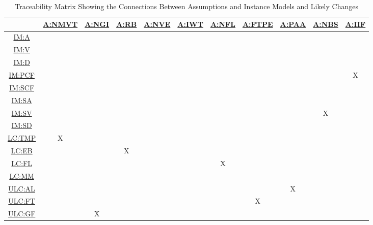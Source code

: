 \documentclass[12pt]{article}
\newcommand{\hpref}[1]{\hyperref[#1]{#1}}
\begin{document}
\begin{table}[H]
\centering
\begin{tabular}{|c|c|c|c|c|c|c|c|c|c|c|}
\hline
	& \hpref{A:NMVT}& \hpref{A:NGI}& \hpref{A:RB}& \hpref{A:NVE}& \hpref{A:IWT}& \hpref{A:NFL}& \hpref{A:FTPE}& \hpref{A:PAA}& \hpref{A:NBS}& \hpref{A:IIF}\\
\hline
\hpref{IM:A}       & & & & & & & & & & \\ \hline
\hpref{IM:V}       & & & & & & & & & & \\ \hline
\hpref{IM:D}       & & & & & & & & & & \\ \hline
\hpref{IM:PCF}       & & & & & & & & & &X \\ \hline
\hpref{IM:SCF}       & & & & & & & & & & \\ \hline
\hpref{IM:SA}       & & & & & & & & & & \\ \hline
\hpref{IM:SV}       & & & & & & & & &X& \\ \hline
\hpref{IM:SD}       & & & & & & & & & & \\ \hline
\hpref{LC:TMP}        &X& & & & & & & & & \\ \hline
\hpref{LC:EB}        & & &X& & & & & & & \\ \hline
\hpref{LC:FL}        & & & & & &X& & & & \\ \hline
\hpref{LC:MM}        & & & & & & & & & & \\ \hline
\hpref{ULC:AL}      & & & & & & & &X& & \\ \hline
\hpref{ULC:FT}      & & & & & & &X& & & \\ \hline
\hpref{ULC:GF}      & &X& & & & & & & & \\ \hline
\end{tabular}
\caption{Traceability Matrix Showing the Connections Between Assumptions and Instance Models and Likely Changes}
\label{Table:trace_Assumptions}
\end{table}
\end{document}
